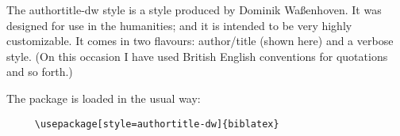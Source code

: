 
\usepackage[style=authortitle-dw,backend=biber]{biblatex}



\renewcommand{\showingstyle}{DW Author/Title}
\usepackage[british]{babel}
%
The \textsf{authortitle-dw} style is a style produced by Dominik Waßenhoven. It was designed for use in the humanities; and it is intended to be very highly customizable. It comes in two flavours: author/title (shown here) and a verbose style. (On this occasion I have used British English conventions for quotations and so forth.)

\quad The package is loaded in the usual way:
\begin{verbatim}
     \usepackage[style=authortitle-dw]{biblatex}
\end{verbatim}





